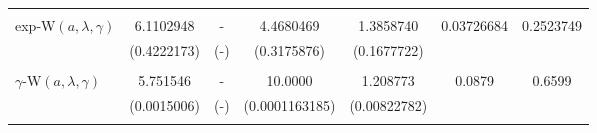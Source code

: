 \documentclass[twoside,leqno,11pt]{article}
\begin{document}
\begin{table}[!htb]
\begin{tabular}{lcccccc}
 & & & & &  \\
exp-W$(a,\lambda,\gamma)$   &    6.1102948   & - &   4.4680469 &  1.3858740 &   0.03726684   & 0.2523749 \\
&   (0.4222173) & (-) & (0.3175876) & (0.1677722)   &  & \\

 & & & & &  \\
$\gamma$-W$(a,\lambda,\gamma)$    & 5.751546  & - &  10.0000 & 1.208773&  0.0879 & 0.6599  \\
&  (0.0015006)&  (-)&  (0.0001163185) &(0.00822782)    &  & \\

 & & & & &  \\





                                                     \hline
\end{tabular}
\end{table}
\end{document}
